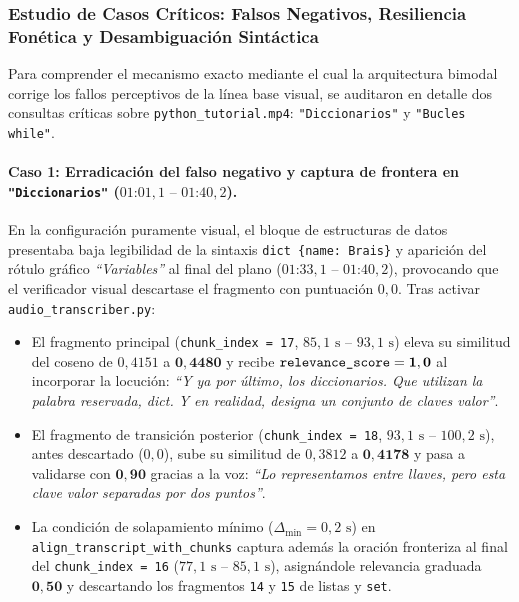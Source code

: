 \subsubsection{Estudio de Casos Críticos: Falsos Negativos, Resiliencia Fonética y Desambiguación Sintáctica}
\label{subsubsec:estudio_casos_criticos_audio}
Para comprender el mecanismo exacto mediante el cual la arquitectura bimodal corrige los fallos perceptivos de la línea base visual, se auditaron en detalle dos consultas críticas sobre \texttt{python\_tutorial.mp4}: \texttt{\string"Diccionarios\string"} y \texttt{\string"Bucles while\string"}.

\paragraph{Caso 1: Erradicación del falso negativo y captura de frontera en \texttt{\string"Diccionarios\string"} ($01\text{:}01{,}1\text{ -- }01\text{:}40{,}2$).}
En la configuración puramente visual, el bloque de estructuras de datos presentaba baja legibilidad de la sintaxis \texttt{dict \{name: Brais\}} y aparición del rótulo gráfico \textit{``Variables''} al final del plano ($01\text{:}33{,}1\text{ -- }01\text{:}40{,}2$), provocando que el verificador visual descartase el fragmento con puntuación $0,0$. Tras activar \texttt{audio\_transcriber.py}:
\begin{itemize}
    \item El fragmento principal (\texttt{chunk\_index = 17}, $85,1\text{ s -- }93,1\text{ s}$) eleva su similitud del coseno de $0,4151$ a $\mathbf{0,4480}$ y recibe $\text{\texttt{relevance\_score}} = \mathbf{1,0}$ al incorporar la locución: \textit{``Y ya por último, los diccionarios. Que utilizan la palabra reservada, dict. Y en realidad, designa un conjunto de claves valor''}.
    \item El fragmento de transición posterior (\texttt{chunk\_index = 18}, $93,1\text{ s -- }100,2\text{ s}$), antes descartado ($0,0$), sube su similitud de $0,3812$ a $\mathbf{0,4178}$ y pasa a validarse con $\mathbf{0,90}$ gracias a la voz: \textit{``Lo representamos entre llaves, pero esta clave valor separadas por dos puntos''}.
    \item La condición de solapamiento mínimo ($\Delta_{\min} = 0,2\text{ s}$) en \texttt{align\_transcript\_with\_chunks} captura además la oración fronteriza al final del \texttt{chunk\_index = 16} ($77,1\text{ s -- }85,1\text{ s}$), asignándole relevancia graduada $\mathbf{0,50}$ y descartando los fragmentos \texttt{14} y \texttt{15} de listas y \texttt{set}.
\end{itemize}

